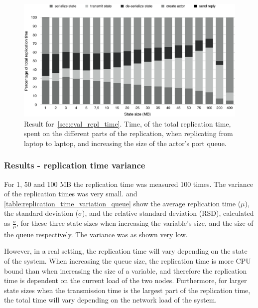 \documentclass{cslthse-msc}
\begin{document}
\begin{figure}[hbt!]
\centering
\includegraphics[scale=0.5]{images/results/replication_time/laptop_parts_queue.pdf} 
\caption[Replication time parts in~\cref{sec:eval_repl_time}, laptop-laptop, increasing queue size]{Result for~\cref{sec:eval_repl_time}. Time, of the total replication time, spent on the different parts of the replication, when replicating from laptop to laptop, and increasing the size of the actor's port queue.} \label{fig:replication_time_parts_laptop_queue}
\end{figure}

\subsubsection*{Results - replication time variance}
For 1, 50 and 100 MB the replication time was measured 100 times. The variance of the replication times was very small.  and \cref{table:replication_time_variation_queue} show the average replication time ($\mu$), the standard deviation ($\sigma$), and the relative standard deviation (RSD), calculated as $\frac{\sigma}{\mu}$, for these three state sizes when increasing the variable's size, and the size of the queue respectively. The variance was as shown very low. 

However, in a real setting, the replication time will vary depending on the state of the system. When increasing the queue size, the replication time is more CPU bound than when increasing the size of a variable, and therefore the replication time is dependent on the current load of the two nodes. Furthermore, for larger state sizes when the transmission time is the largest part of the replication time, the total time will vary depending on the network load of the system.
 
\end{document}
